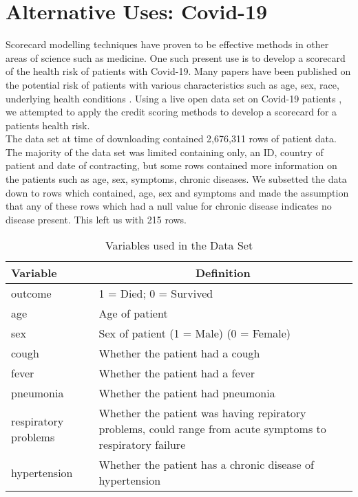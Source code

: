 \chapter{Alternative Uses: Covid-19} \label{chapter:5}

Scorecard modelling techniques have proven to be effective methods in other areas of science such as medicine. One such present use is to develop a scorecard of the health risk of patients with Covid-19. Many papers have been published on the potential risk of patients with various characteristics such as age, sex, race, underlying health conditions \parencite{du2020predictors}. Using a live open data set on Covid-19 patients \parencite{kraemer2020epidemiological}, we attempted to apply the credit scoring methods to develop a scorecard for a patients health risk. \\ 

The data set at time of downloading contained 2,676,311 rows of patient data. The majority of the data set was limited containing only, an ID, country of patient and date of contracting, but some rows contained more information on the patients such as age, sex, symptoms, chronic diseases. We subsetted the data down to rows which contained, age, sex and symptoms and made the assumption that any of these rows which had a null value for chronic disease indicates no disease present. This left us with 215 rows. \\

\begin{table}[H]
	\centering
	\renewcommand{\arraystretch}{1.25}
	\begin{tabular}{l p{10cm}}
	\hline
	Variable & \multicolumn{1}{c}{Definition}\\ 
	\hline
	outcome & 1 = Died; 0 = Survived \\
	age & Age of patient \\
	sex & Sex of patient (1 = Male) (0 = Female) \\
	cough & Whether the patient had a cough \\
	fever & Whether the patient had a fever \\
	pneumonia & Whether the patient had pneumonia \\
	respiratory problems & Whether the patient was having repiratory problems, could range from acute symptoms to respiratory failure \\
	hypertension & Whether the patient has a chronic disease of hypertension \\
	\end{tabular}
	\caption{Variables used in the Data Set \label{CovidData}}
\end{table}

